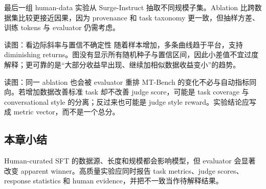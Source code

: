 最后一组 human-data 实验从 Surge-Instruct 抽取不同规模子集。Ablation 比跨数据集比较更接近因果，因为 provenance 和 task taxonomy 更一致，但抽样方差、训练 tokens 与 evaluator 仍需考虑。


\begin{knowledgebox}{读图：看边际斜率与置信不确定性}
随着样本增加，多条曲线趋于平台，支持 diminishing returns。图没有显示所有随机种子与置信区间，因此小差值不宜过度解释；更可靠的是“大部分收益早出现、继续加相似数据收益变小”的趋势。
\end{knowledgebox}


\begin{knowledgebox}{读图：同一 ablation 也会被 evaluator 重排}
MT-Bench 的变化不必与自动指标同向。若增加数据改善标准 task 却不改善 judge score，可能是 task coverage 与 conversational style 的分离；反过来也可能是 judge style reward。实验结论应写成 metric vector，而不是一个总分。
\end{knowledgebox}


\subsection{本章小结}

Human-curated SFT 的数据源、长度和规模都会影响模型，但 evaluator 会显著改变 apparent winner。高质量实验应同时报告 task metrics、judge scores、response statistics 和 human evidence，并把不一致当作待解释结果。

